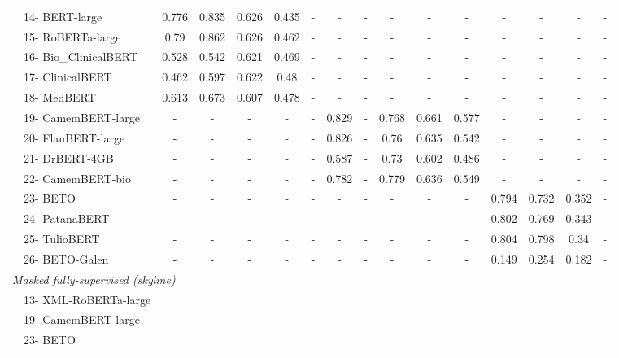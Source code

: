 {\begin{tabular}{ll|ccccc|ccccc|cccc}
    & 14- BERT-large & 0.776 & 0.835 & 0.626 & 0.435 & - & - & - & - & - & - & - & - & - & - \\
    & 15- RoBERTa-large & 0.79 & 0.862 & 0.626 & 0.462 & - & - & - & - & - & - & - & - & - & - \\
    & 16- Bio\_ClinicalBERT & 0.528 & 0.542 & 0.621 & 0.469 & - & - & - & - & - & - & - & - & - & - \\
    & 17- ClinicalBERT & 0.462 & 0.597 & 0.622 & 0.48 & - & - & - & - & - & - & - & - & - & - \\
    & 18- MedBERT & 0.613 & 0.673 & 0.607 & 0.478 & - & - & - & - & - & - & - & - & - & - \\
    & 19- CamemBERT-large & - & - & - & - & - & 0.829 & - & 0.768 & 0.661 & 0.577 & - & - & - & - \\
    & 20- FlauBERT-large & - & - & - & - & - & 0.826 & - & 0.76 & 0.635 & 0.542 & - & - & - & - \\
    & 21- DrBERT-4GB & - & - & - & - & - & 0.587 & - & 0.73 & 0.602 & 0.486 & - & - & - & - \\
    & 22- CamemBERT-bio & - & - & - & - & - & 0.782 & - & 0.779 & 0.636 & 0.549 & - & - & - & - \\
    & 23- BETO & - & - & - & - & - & - & - & - & - & - & 0.794 & 0.732 & 0.352 & - \\
    & 24- PatanaBERT & - & - & - & - & - & - & - & - & - & - & 0.802 & 0.769 & 0.343 & - \\
    & 25- TulioBERT & - & - & - & - & - & - & - & - & - & - & 0.804 & 0.798 & 0.34 & - \\
    & 26- BETO-Galen & - & - & - & - & - & - & - & - & - & - & 0.149 & 0.254 & 0.182 & - \\
   \midrule
   \midrule
   \multicolumn{16}{l}{\textit{Masked fully-supervised (skyline)}} \\
   \midrule
    & 13- XML-RoBERTa-large & & & & & & & & & & & & & & \\
    & 19- CamemBERT-large & & & & & & & & & & & & & & \\
    & 23- BETO & & & & & & & & & & & & & & \\
   \bottomrule
   \end{tabular}}